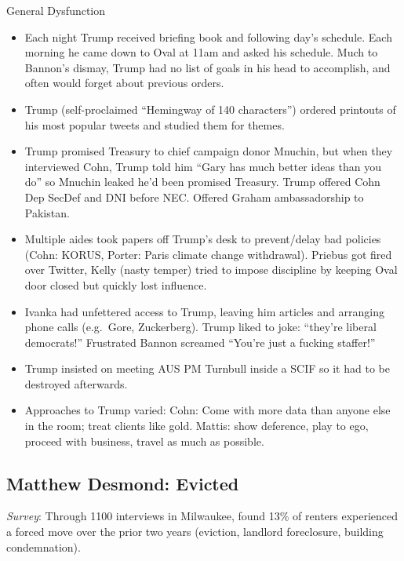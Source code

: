 \documentclass[
]{article}
\begin{document}
General Dysfunction

\begin{itemize}
\item
  Each night Trump received briefing book and following day's schedule.
  Each morning he came down to Oval at 11am and asked his schedule. Much
  to Bannon's dismay, Trump had no list of goals in his head to
  accomplish, and often would forget about previous orders.
\item
  Trump (self-proclaimed ``Hemingway of 140 characters'') ordered
  printouts of his most popular tweets and studied them for themes.
\item
  Trump promised Treasury to chief campaign donor Mnuchin, but when they
  interviewed Cohn, Trump told him ``Gary has much better ideas than you
  do'' so Mnuchin leaked he'd been promised Treasury. Trump offered Cohn
  Dep SecDef and DNI before NEC. Offered Graham ambassadorship to
  Pakistan.
\item
  Multiple aides took papers off Trump's desk to prevent/delay bad
  policies (Cohn: KORUS, Porter: Paris climate change withdrawal).
  Priebus got fired over Twitter, Kelly (nasty temper) tried to impose
  discipline by keeping Oval door closed but quickly lost influence.
\item
  Ivanka had unfettered access to Trump, leaving him articles and
  arranging phone calls (e.g.~Gore, Zuckerberg). Trump liked to joke:
  ``they're liberal democrats!'' Frustrated Bannon screamed ``You're
  just a fucking staffer!''
\item
  Trump insisted on meeting AUS PM Turnbull inside a SCIF so it had to
  be destroyed afterwards.
\item
  Approaches to Trump varied: Cohn: Come with more data than anyone else
  in the room; treat clients like gold. Mattis: show deference, play to
  ego, proceed with business, travel as much as possible.
\end{itemize}

\hypertarget{matthew-desmond-evicted}{%
\subsection{Matthew Desmond: Evicted}\label{matthew-desmond-evicted}}

\emph{Survey}: Through 1100 interviews in Milwaukee, found 13\% of
renters experienced a forced move over the prior two years (eviction,
landlord foreclosure, building condemnation).
\end{document}

